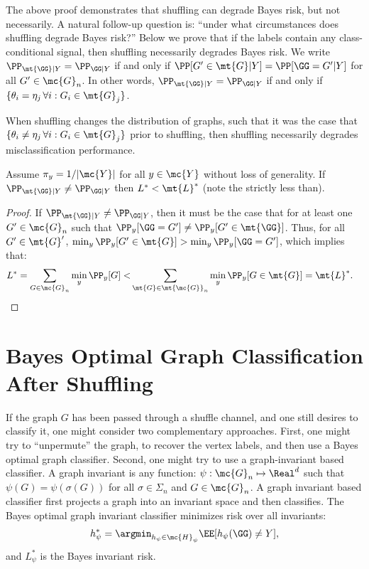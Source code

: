 \documentclass[10pt,journal,cspaper,compsoc]{IEEEtran}
\begin{document}

The above proof demonstrates that shuffling can degrade Bayes risk, but not necessarily.  A natural follow-up question is: ``under what circumstances does shuffling degrade Bayes risk?''  Below we prove that if the labels contain any class-conditional signal, then shuffling necessarily degrades Bayes risk.  We write  $\PP_{\mt{\GG}|Y} =\PP_{\GG|Y}$ if and only if $\PP[G' \in \mt{G}| Y]=\PP[\GG=G'|Y] $ for all $ G' \in \mc{G}_n$.  In other words, $\PP_{\mt{\GG}|Y}=\PP_{\GG|Y}$ if and only if $\{\theta_i=\eta_j \, \forall i : G_i \in \mt{G}_j\}$.

 When shuffling changes the distribution of graphs, such that it was the case that $\{\theta_i \neq \eta_j \, \forall i : G_i \in \mt{G}_j\}$ prior to shuffling, then shuffling necessarily degrades misclassification performance.

\begin{thm}
Assume $\pi_y=1/|\mc{Y}| $ for all $ y \in \mc{Y}$ without loss of generality.  If $\PP_{\mt{\GG}|Y} \neq \PP_{\GG|Y}$ then $L^* < \mt{L}^*$ (note the strictly less than).
\end{thm}

\begin{proof}
If $\PP_{\mt{\GG}|Y} \neq \PP_{\GG|Y}$, then it must be the case that for at least one $G'\in \mc{G}_n$ such that $\PP_y[\GG=G'] \neq \PP_y[G' \in \mt{\GG}]$.  Thus, for all $G' \in \mt{G}'$, $\min_y \PP_y[G' \in \mt{G}] > \min_y \PP_y[\GG=G']$, which implies that:
\begin{align}
	L^*=\sum_{G \in \mc{G}_n} \min_y \PP_y[G] < &\sum_{\mt{G} \in \mt{\mc{G}}_n} \min_y \PP_y[G \in \mt{G}] = \mt{L}^*.
\end{align}
\end{proof}




\section{Bayes Optimal Graph Classification After Shuffling} %
\label{sec:bayes_optimal_graph_classification_after_shuffling}

If the graph $G$ has been passed through a shuffle channel, and one still desires to classify it, one might consider two complementary approaches.  First, one might try to ``unpermute'' the graph, to recover the vertex labels, and then use a Bayes optimal graph classifier.  Second, one might try to use a graph-invariant based classifier.  A graph invariant is any function: $\psi: \mc{G}_n \mapsto \Real^d$ such that $\psi(G)=\psi(\sigma(G))$ for all $\sigma \in \Sigma_n$ and $G \in \mc{G}_n$.  A graph invariant based classifier first projects a graph into an invariant space and then classifies.  The Bayes optimal graph invariant classifier minimizes risk over all invariants: 
\begin{align}
	h^*_{\psi}=\argmin_{h_{\psi} \in \mc{H}_{\psi}} \EE[h_{\psi}(\GG)\neq Y],
\end{align}
and $L^*_{\psi}$ is the Bayes invariant risk.  
\end{document}
